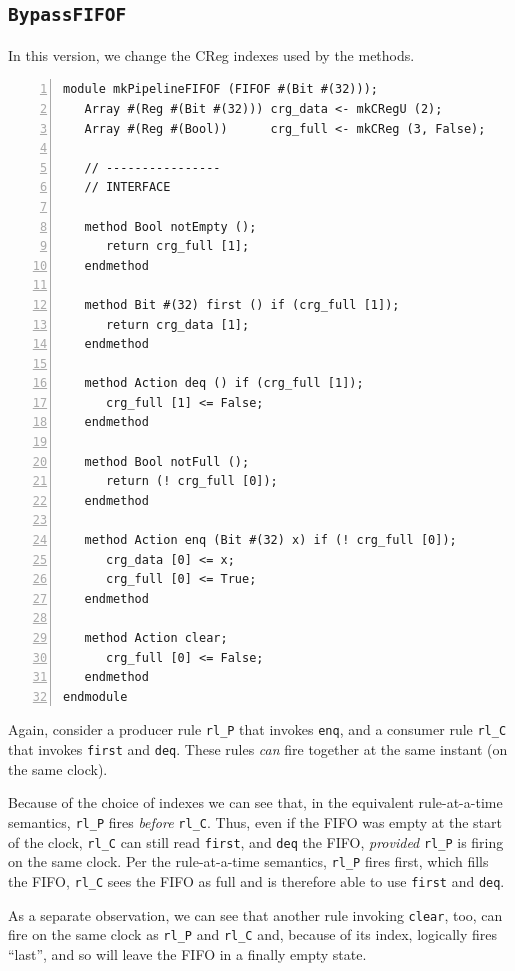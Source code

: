 
\subsection{{\tt BypassFIFOF}}

In this version, we change the CReg indexes used by the methods.

{\footnotesize
\begin{Verbatim}[frame=single, numbers=left]
module mkPipelineFIFOF (FIFOF #(Bit #(32)));
   Array #(Reg #(Bit #(32))) crg_data <- mkCRegU (2);
   Array #(Reg #(Bool))      crg_full <- mkCReg (3, False);

   // ----------------
   // INTERFACE

   method Bool notEmpty ();
      return crg_full [1];
   endmethod

   method Bit #(32) first () if (crg_full [1]);
      return crg_data [1];
   endmethod

   method Action deq () if (crg_full [1]);
      crg_full [1] <= False;
   endmethod

   method Bool notFull ();
      return (! crg_full [0]);
   endmethod

   method Action enq (Bit #(32) x) if (! crg_full [0]);
      crg_data [0] <= x;
      crg_full [0] <= True;
   endmethod

   method Action clear;
      crg_full [0] <= False;
   endmethod
endmodule
\end{Verbatim}
}

Again, consider a producer rule \verb|rl_P| that invokes \verb|enq|,
and a consumer rule \verb|rl_C| that invokes \verb|first| and
\verb|deq|.  These rules \emph{can} fire together at the same instant
(on the same clock).

Because of the choice of indexes we can see that, in the equivalent
rule-at-a-time semantics, \verb|rl_P| fires \emph{before} \verb|rl_C|.
Thus, even if the FIFO was empty at the start of the clock,
\verb|rl_C| can still read \verb|first|, and \verb|deq| the FIFO,
\emph{provided} \verb|rl_P| is firing on the same clock.  Per the
rule-at-a-time semantics, \verb|rl_P| fires first, which fills the
FIFO, {\ie} \verb|rl_C| sees the FIFO as full and is therefore able to
use \verb|first| and \verb|deq|.

As a separate observation, we can see that another rule invoking
\verb|clear|, too, can fire on the same clock as \verb|rl_P| and
\verb|rl_C| and, because of its index, logically fires ``last'', and
so will leave the FIFO in a finally empty state.

